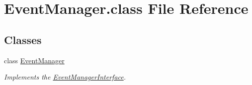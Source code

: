 \hypertarget{EventManager_8class}{\section{Event\-Manager.\-class File Reference}
\label{EventManager_8class}
}
\subsection*{Classes}
\begin{DoxyCompactItemize}
\item 
class \hyperlink{classEventManager}{Event\-Manager}
\begin{DoxyCompactList}\small\item\em Implements the \hyperlink{interfaceEventManagerInterface}{Event\-Manager\-Interface}. \end{DoxyCompactList}\end{DoxyCompactItemize}
